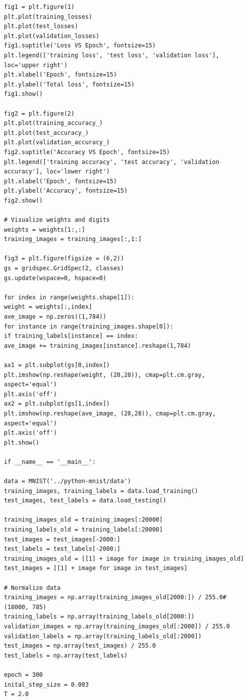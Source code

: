 \documentclass{article} %
\begin{document}
\begin{lstlisting}
fig1 = plt.figure(1)
plt.plot(training_losses)
plt.plot(test_losses)
plt.plot(validation_losses)
fig1.suptitle('Loss VS Epoch', fontsize=15)
plt.legend(['training loss', 'test loss', 'validation loss'], loc='upper right')
plt.xlabel('Epoch', fontsize=15)
plt.ylabel('Total loss', fontsize=15)
fig1.show()

fig2 = plt.figure(2)
plt.plot(training_accuracy_)
plt.plot(test_accuracy_)
plt.plot(validation_accuracy_)
fig2.suptitle('Accuracy VS Epoch', fontsize=15)
plt.legend(['training accuracy', 'test accuracy', 'validation accuracy'], loc='lower right')
plt.xlabel('Epoch', fontsize=15)
plt.ylabel('Accuracy', fontsize=15)
fig2.show()

# Visualize weights and digits
weights = weights[1:,:]
training_images = training_images[:,1:]

fig3 = plt.figure(figsize = (6,2))
gs = gridspec.GridSpec(2, classes)
gs.update(wspace=0, hspace=0)

for index in range(weights.shape[1]):
weight = weights[:,index]
ave_image = np.zeros((1,784))
for instance in range(training_images.shape[0]):
if training_labels[instance] == index:
ave_image += training_images[instance].reshape(1,784)

ax1 = plt.subplot(gs[0,index])
plt.imshow(np.reshape(weight, (28,28)), cmap=plt.cm.gray, aspect='equal')
plt.axis('off')
ax2 = plt.subplot(gs[1,index])
plt.imshow(np.reshape(ave_image, (28,28)), cmap=plt.cm.gray, aspect='equal')
plt.axis('off')
plt.show()

if __name__ == '__main__':

data = MNIST('../python-mnist/data')
training_images, training_labels = data.load_training()
test_images, test_labels = data.load_testing()

training_images_old = training_images[:20000]
training_labels_old = training_labels[:20000]
test_images = test_images[-2000:]
test_labels = test_labels[-2000:]
training_images_old = [[1] + image for image in training_images_old]
test_images = [[1] + image for image in test_images]

# Normalize data
training_images = np.array(training_images_old[2000:]) / 255.0# (18000, 785)
training_labels = np.array(training_labels_old[2000:]) 
validation_images = np.array(training_images_old[:2000]) / 255.0
validation_labels = np.array(training_labels_old[:2000])
test_images = np.array(test_images) / 255.0
test_labels = np.array(test_labels)

epoch = 300
inital_step_size = 0.003
T = 2.0


\end{lstlisting}
\end{document}
